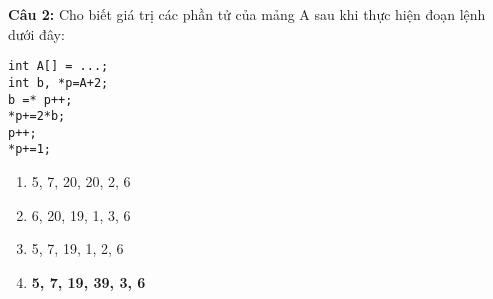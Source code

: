 \documentclass[preview,border=12pt]{standalone}
\begin{document}
\textbf{Câu 2:} Cho biết giá trị các phần tử của mảng A sau khi thực hiện đoạn lệnh dưới đây:

\begin{verbatim}
int A[] = ...;
int b, *p=A+2;
b =* p++;
*p+=2*b;
p++;
*p+=1;
\end{verbatim}

\begin{enumerate}
    \item {5, 7, 20, 20, 2, 6}
    \item {6, 20, 19, 1, 3, 6}
    \item {5, 7, 19, 1, 2, 6}
    \item \textbf{{5, 7, 19, 39, 3, 6}}
\end{enumerate}
\end{document}
